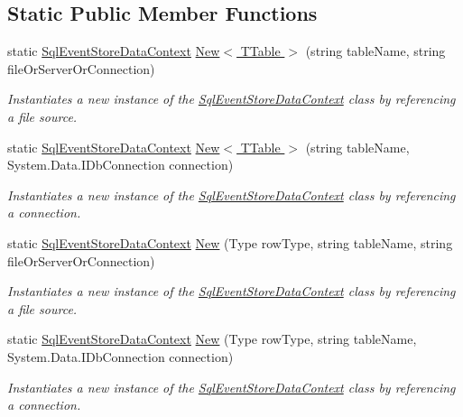 \subsection*{Static Public Member Functions}
\begin{DoxyCompactItemize}
\item 
static \hyperlink{classCqrs_1_1Events_1_1SqlEventStoreDataContext}{Sql\+Event\+Store\+Data\+Context} \hyperlink{classCqrs_1_1Events_1_1SqlEventStoreDataContext_a419c48a01192a0157934defa22a70c14_a419c48a01192a0157934defa22a70c14}{New$<$ T\+Table $>$} (string table\+Name, string file\+Or\+Server\+Or\+Connection)
\begin{DoxyCompactList}\small\item\em Instantiates a new instance of the \hyperlink{classCqrs_1_1Events_1_1SqlEventStoreDataContext}{Sql\+Event\+Store\+Data\+Context} class by referencing a file source. \end{DoxyCompactList}\item 
static \hyperlink{classCqrs_1_1Events_1_1SqlEventStoreDataContext}{Sql\+Event\+Store\+Data\+Context} \hyperlink{classCqrs_1_1Events_1_1SqlEventStoreDataContext_a1220bc1424f6346662dc4adf1f23765f_a1220bc1424f6346662dc4adf1f23765f}{New$<$ T\+Table $>$} (string table\+Name, System.\+Data.\+I\+Db\+Connection connection)
\begin{DoxyCompactList}\small\item\em Instantiates a new instance of the \hyperlink{classCqrs_1_1Events_1_1SqlEventStoreDataContext}{Sql\+Event\+Store\+Data\+Context} class by referencing a connection. \end{DoxyCompactList}\item 
static \hyperlink{classCqrs_1_1Events_1_1SqlEventStoreDataContext}{Sql\+Event\+Store\+Data\+Context} \hyperlink{classCqrs_1_1Events_1_1SqlEventStoreDataContext_ae059fb99b1100d4d7fb917b635c1be5d_ae059fb99b1100d4d7fb917b635c1be5d}{New} (Type row\+Type, string table\+Name, string file\+Or\+Server\+Or\+Connection)
\begin{DoxyCompactList}\small\item\em Instantiates a new instance of the \hyperlink{classCqrs_1_1Events_1_1SqlEventStoreDataContext}{Sql\+Event\+Store\+Data\+Context} class by referencing a file source. \end{DoxyCompactList}\item 
static \hyperlink{classCqrs_1_1Events_1_1SqlEventStoreDataContext}{Sql\+Event\+Store\+Data\+Context} \hyperlink{classCqrs_1_1Events_1_1SqlEventStoreDataContext_aa8e29c6f9d3220b279c8748e82725b51_aa8e29c6f9d3220b279c8748e82725b51}{New} (Type row\+Type, string table\+Name, System.\+Data.\+I\+Db\+Connection connection)
\begin{DoxyCompactList}\small\item\em Instantiates a new instance of the \hyperlink{classCqrs_1_1Events_1_1SqlEventStoreDataContext}{Sql\+Event\+Store\+Data\+Context} class by referencing a connection. \end{DoxyCompactList}\end{DoxyCompactItemize}


